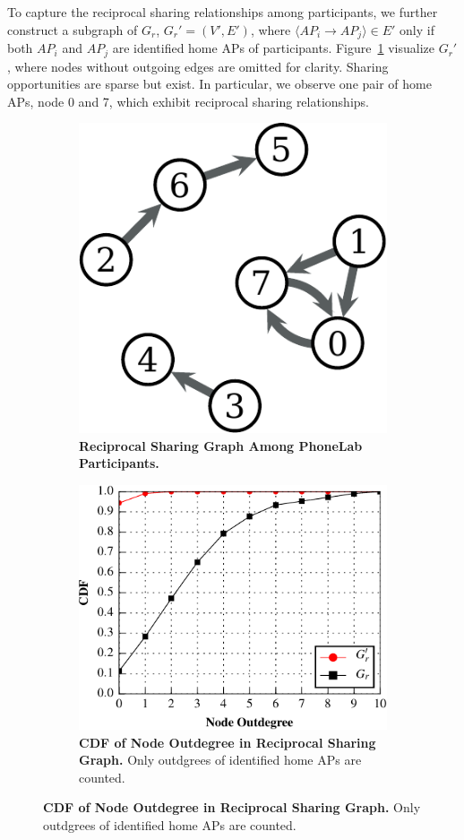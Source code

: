 To capture the reciprocal sharing relationships among \PhoneLab{} participants,
we further construct a subgraph of $G_r$, $G_r'=(V', E')$, where $\langle AP_i
\rightarrow AP_j \rangle \in E'$ only if both $AP_i$ and $AP_j$ are identified
home APs of \PhoneLab{} participants. Figure~\ref{fig:reciprocal} visualize
$G_r'$, where nodes without outgoing edges are omitted for clarity. Sharing
opportunities are sparse but exist. In particular, we observe one pair of home
APs, node 0 and 7, which exhibit reciprocal sharing relationships.

\begin{figure}[t]
  \centering
  \begin{subfigure}{\columnwidth}
    \centering
    \includegraphics[width=0.5\columnwidth]{./figures/ReciprocalSharingFigure.pdf}
    \caption{\textbf{Reciprocal Sharing Graph Among PhoneLab Participants.}}
    \label{fig:reciprocal}
  \end{subfigure}
  \begin{subfigure}{\columnwidth}
    \includegraphics[width=\columnwidth]{./figures/SpatialSparseFigure.pdf}
    \caption{\textbf{CDF of Node Outdegree in Reciprocal Sharing Graph.} Only
    outdgrees of identified \PhoneLab{} home APs are counted. }
    \label{fig:sparse}
  \end{subfigure}
\end{figure}

